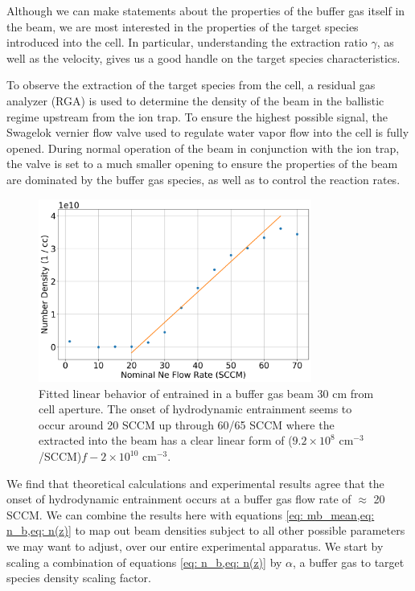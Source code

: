 Although we can make statements about the properties of the buffer gas itself in the beam, we are most interested in the properties of the target species introduced into the cell. In particular, understanding the extraction ratio $\gamma$, as well as the velocity, gives us a good handle on the target species characteristics.

To observe the extraction of the target species from the cell, a residual gas analyzer (RGA) is used to determine the density of the beam in the ballistic regime upstream from the ion trap. To ensure the highest possible signal, the Swagelok vernier flow valve used to regulate water vapor flow into the cell is fully opened. During normal operation of the beam in conjunction with the ion trap, the valve is set to a much smaller opening to ensure the properties of the beam are dominated by the buffer gas species, as well as to control the reaction rates.

\begin{figure}[H]
	\centering
	\includegraphics[width=0.8\textwidth]{images/CBGB_hydrodynamic_fit.png}
	\caption{Fitted linear behavior of  entrained in a  buffer gas beam 30 cm from cell aperture. The onset of hydrodynamic entrainment seems to occur around 20 SCCM up through 60/65 SCCM where the  extracted into the beam has a clear linear form of ($9.2 \times 10^8$ cm$^{-3}$/SCCM)$f - 2 \times 10^{10}$ cm$^{-3}$.}
	\label{fig: rga entrainment}
\end{figure}

We find that theoretical calculations and experimental results agree that the onset of hydrodynamic entrainment occurs at a buffer gas flow rate of $\approx$ 20 SCCM. We can combine the results here with equations \cref{eq: mb_mean,eq: n_b,eq: n(z)} to map out beam densities subject to all other possible parameters we may want to adjust, over our entire experimental apparatus. We start by scaling a combination of equations \cref{eq: n_b,eq: n(z)} by $\alpha$, a buffer gas to target species density scaling factor.

